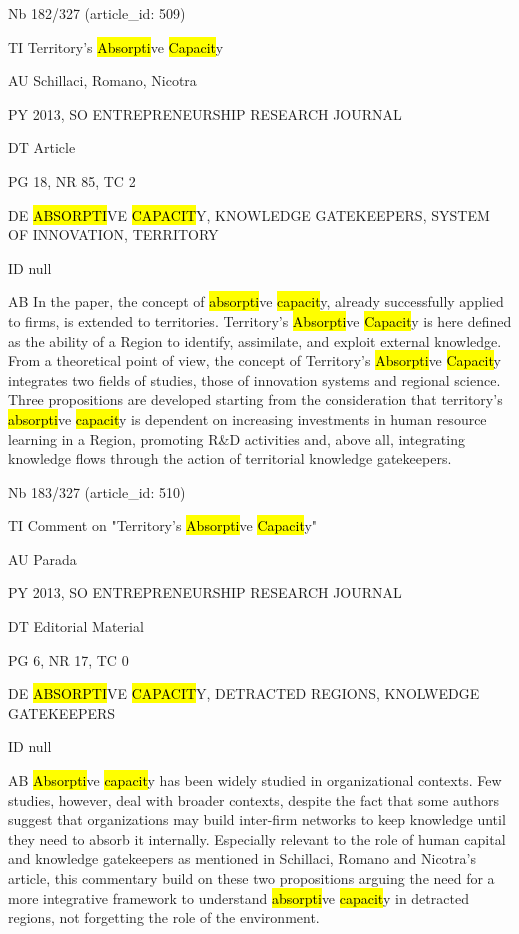 \documentclass[a4paper]{article}
\begin{document}
\vspace*{-2cm}
Nb \tabto{0cm}182/327 (article\_id: 509)\par
TI \tabto{0cm}Territory's \hl{Absorpti}ve \hl{Capacit}y\par
AU \tabto{0cm}Schillaci, Romano, Nicotra\par
PY \tabto{0cm}2013, SO ENTREPRENEURSHIP RESEARCH JOURNAL\par
DT \tabto{0cm}Article\par
PG \tabto{0cm}18, NR 85, TC 2\par
DE \tabto{0cm}\hl{ABSORPTI}VE \hl{CAPACIT}Y, KNOWLEDGE GATEKEEPERS, SYSTEM OF INNOVATION, TERRITORY\par
ID \tabto{0cm}null\par
AB \tabto{0cm}In the paper, the concept of \hl{absorpti}ve \hl{capacit}y, already successfully applied to firms, is extended to territories. Territory's \hl{Absorpti}ve \hl{Capacit}y is here defined as the ability of a Region to identify, assimilate, and exploit external knowledge.
From a theoretical point of view, the concept of Territory's \hl{Absorpti}ve \hl{Capacit}y integrates two fields of studies, those of innovation systems and regional science.
Three propositions are developed starting from the consideration that territory's \hl{absorpti}ve \hl{capacit}y is dependent on increasing investments in human resource learning in a Region, promoting R\&D activities and, above all, integrating knowledge flows through the action of territorial knowledge gatekeepers.\par
\clearpage

\vspace*{-2cm}
Nb \tabto{0cm}183/327 (article\_id: 510)\par
TI \tabto{0cm}Comment on "Territory's \hl{Absorpti}ve \hl{Capacit}y"\par
AU \tabto{0cm}Parada\par
PY \tabto{0cm}2013, SO ENTREPRENEURSHIP RESEARCH JOURNAL\par
DT \tabto{0cm}Editorial Material\par
PG \tabto{0cm}6, NR 17, TC 0\par
DE \tabto{0cm}\hl{ABSORPTI}VE \hl{CAPACIT}Y, DETRACTED REGIONS, KNOLWEDGE GATEKEEPERS\par
ID \tabto{0cm}null\par
AB \tabto{0cm}\hl{Absorpti}ve \hl{capacit}y has been widely studied in organizational contexts. Few studies, however, deal with broader contexts, despite the fact that some authors suggest that organizations may build inter-firm networks to keep knowledge until they need to absorb it internally. Especially relevant to the role of human capital and knowledge gatekeepers as mentioned in Schillaci, Romano and Nicotra's article, this commentary build on these two propositions arguing the need for a more integrative framework to understand \hl{absorpti}ve \hl{capacit}y in detracted regions, not forgetting the role of the environment.\par
\clearpage
\end{document}
